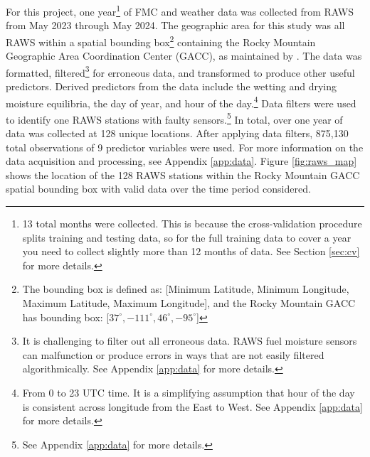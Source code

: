 \documentclass[11pt]{article}%
\begin{document}
For this project, one year\footnote{13 total months were collected. This is because the cross-validation procedure splits training and testing data, so for the full training data to cover a year you need to collect slightly more than 12 months of data. See Section \ref{sec:cv} for more details.} of FMC and weather data was collected from RAWS from May 2023 through May 2024. The geographic area for this study was all RAWS within a spatial bounding box\footnote{
The bounding box is defined as: [Minimum Latitude, Minimum Longitude, Maximum Latitude, Maximum Longitude], and the Rocky Mountain GACC has bounding box: [$37^\circ, -111^\circ, 46^\circ, -95^\circ$]} containing the Rocky Mountain Geographic Area Coordination Center (GACC), as maintained by \cite{NIFC-2024-GAC}. The data was formatted,  filtered\footnote{It is challenging to filter out all erroneous data. RAWS fuel moisture sensors can malfunction or produce errors in ways that are not easily filtered algorithmically. See Appendix \ref{app:data} for more details.} for erroneous data, and transformed to produce other useful predictors. Derived predictors from the data include the wetting and drying moisture equilibria, the day of year, and hour of the day.\footnote{From 0 to 23 UTC time. It is a simplifying assumption that hour of the day is consistent across longitude from the East to West. See Appendix \ref{app:data} for more details.} Data filters were used to identify one RAWS stations with faulty sensors.\footnote{See Appendix \ref{app:data} for more details.} In total, over one year of data was collected at 128 unique locations. After applying data filters, 875,130 total observations of 9 predictor variables were used. For more information on the data acquisition and processing, see Appendix \ref{app:data}. Figure \ref{fig:raws_map} shows the location of the 128 RAWS stations within the Rocky Mountain GACC spatial bounding box with valid data over the time period considered.
\end{document}
